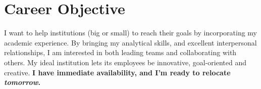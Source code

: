 \documentclass[letterpaper]{article}
\begin{document}
\section*{Career Objective}

I want to help institutions (big or small) to reach their goals by incorporating my academic experience. By bringing my analytical skills, and excellent interpersonal relationships, I am interested in both leading teams and collaborating with others. My ideal institution lets its employees be innovative, goal-oriented and creative. {\bf I have immediate availability, and I'm ready to relocate \emph{tomorrow}.}

\bigskip
\end{document}

